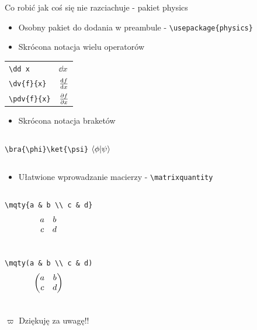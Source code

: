 \documentclass{beamer}
\theoremstyle{newblock}
\begin{document}
\begin{frame}[fragile]{Co robić jak coś się nie razciachuje - pakiet physics}
    \begin{itemize}
        \item Osobny pakiet do dodania w preambule - \verb|\usepackage{physics}|
        \item Skrócona notacja wielu operatorów 
    \end{itemize}
    
    \begin{table}[]
    \begin{tabular}{l l}
         \verb|\dd x| & $\dd x$ \\
         \verb|\dv{f}{x}|& $ \dv{f}{x}$\\
         \verb|\pdv{f}{x}| & $ \pdv{f}{x}$
    \end{tabular}
    \end{table}

    \begin{itemize}
        \item Skrócona notacja braketów
    \end{itemize}
    \begin{columns}
            \centering
            \verb|\bra{\phi}\ket{\psi}|
            $\bra{\phi}\ket{\psi}$
    \end{columns}
    \begin{itemize}
        \item Ułatwione wprowadzanie macierzy - \verb|\matrixquantity|
    \end{itemize}
    \begin{columns}
            \centering
            \verb|\mqty{a & b \\ c & d}|
            \begin{equation*}
                \mqty{a & b \\ c & d}
            \end{equation*}
    \end{columns}
    \begin{columns}
            \centering
            \verb|\mqty(a & b \\ c & d)|
            \begin{equation*}
                \mqty(a & b \\ c & d)
            \end{equation*}
    \end{columns}
\end{frame}

\begin{frame}[c]{$\varpi$}
    \centering
    \Huge{Dziękuję za uwagę!!}
\end{frame}
\end{document}
